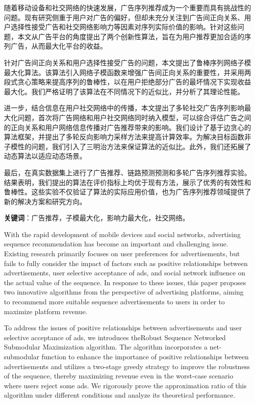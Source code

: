 \cleardoublepage
{}

随着移动设备和社交网络的快速发展，广告序列推荐成为一个重要而具有挑战性的问题。现有研究侧重于用户对广告的偏好，但却未充分关注到广告间正向关系、用户选择性接受广告和社交网络影响力等因素对序列实际价值的影响。针对这些问题，本文从广告平台的角度提出了两个创新性算法，旨在为用户推荐更加合适的序列广告，从而最大化平台的收益。

针对广告间正向关系和用户选择性接受广告的问题，本文提出了鲁棒序列网络子模最大化算法。该算法引入网络子模函数来增强广告间正向关系的重要性，并采用两段式贪心策略来提高序列的鲁棒性，以在用户拒绝部分广告的最坏情况下实现收益最大化。我们严格证明了该算法在不同情况下的近似比，并分析了其理论性能。

进一步，结合信息在用户社交网络中的传播，本文提出了多轮社交广告序列影响最大化问题，首次将广告网络和用户社交网络同时纳入模型，可以综合评估广告之间的正向关系和用户网络信息传播对广告推荐带来的影响。我们设计了基于边贪心的算法框架，并提出了多轮反向影响力采样方法来提高计算效率。为解决目标函数非子模性的问题，我们引入了三明治方法来保证算法的近似比。此外，我们还拓展了动态算法以适应动态场景。

最后，在真实数据集上进行了广告推荐、链路预测预测和多轮广告序列推荐实验。结果表明，我们提出的算法在评价指标上均优于现有方法，展示了优秀的有效性和鲁棒性。这些实验不仅验证了算法的实际应用价值，也为广告序列推荐领域提供了新的解决方案和研究方向。


\textbf{关键词}：广告推荐，子模最大化，影响力最大化，社交网络。


\cleardoublepage
{}

With the rapid development of mobile devices and social networks, advertising sequence recommendation has become an important and challenging issue. Existing research primarily focuses on user preferences for advertisements, but fails to fully consider the impact of factors such as positive relationships between advertisements, user selective acceptance of ads, and social network influence on the actual value of the sequence. In response to these issues, this paper proposes two innovative algorithms from the perspective of advertising platforms, aiming to recommend more suitable sequence advertisements to users in order to maximize platform revenue.

To address the issues of positive relationships between advertisements and user selective acceptance of ads, we introduces theRobust Sequence Networked Submodular Maximization algorithm. The algorithm incorporates a net-submodular function to enhance the importance of positive relationships between advertisements and utilizes a two-stage greedy strategy to improve the robustness of the sequence, thereby maximizing revenue even in the worst-case scenario where users reject some ads. We rigorously prove the approximation ratio of this algorithm under different conditions and analyze its theoretical performance.



